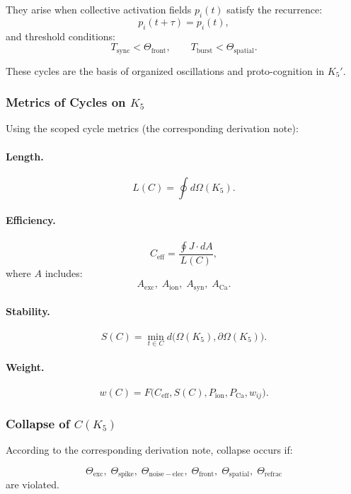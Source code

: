 They arise when collective activation fields
$p_i(t)$ satisfy the recurrence:
\[
  p_i(t+\tau) = p_i(t),
\]
and threshold conditions:
\[
  T_{\mathrm{sync}} < \Theta_{\mathrm{front}},\qquad
  T_{\mathrm{burst}} < \Theta_{\mathrm{spatial}}.
\]

These cycles are the basis of organized oscillations and
proto-cognition in $K_5'$.

\subsubsection{Metrics of Cycles on \texorpdfstring{$K_5$}{K_5}}

Using the scoped cycle metrics (the corresponding derivation note):

\paragraph{Length.}
\[
  L(C)=\oint d\Omega(K_5).
\]

\paragraph{Efficiency.}
\[
  C_{\mathrm{eff}}=\frac{\oint J\cdot dA}{L(C)},
\]
where $A$ includes:
\[
  A_{\mathrm{exc}},\;
  A_{\mathrm{ion}},\;
  A_{\mathrm{syn}},\;
  A_{\mathrm{Ca}}.
\]

\paragraph{Stability.}
\[
  S(C) = 
    \min\limits_{t\in C}
      d\bigl(\Omega(K_5),\partial\Omega(K_5)\bigr).
\]

\paragraph{Weight.}
\[
  w(C) =
    F\bigl(C_{\mathrm{eff}}, S(C), P_{\mathrm{ion}},
      P_{\mathrm{Ca}}, w_{ij}\bigr).
\]

\subsubsection{Collapse of \texorpdfstring{$C(K_5)$}{C(K_5)}}

According to the corresponding derivation note, collapse occurs if:

\[
  \Theta_{\mathrm{exc}},\;
  \Theta_{\mathrm{spike}},\;
  \Theta_{\mathrm{noise-elec}},\;
  \Theta_{\mathrm{front}},\;
  \Theta_{\mathrm{spatial}},\;
  \Theta_{\mathrm{refrac}}
\]
are violated.

